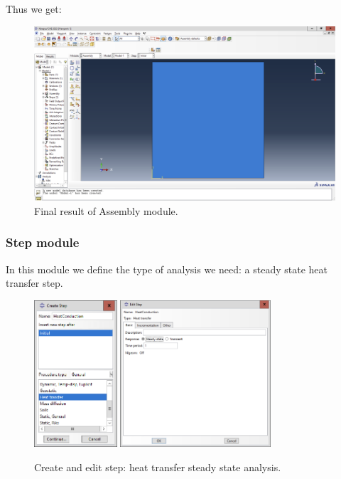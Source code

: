 Thus we get:
\begin{figure}[H]
    \centering
    \includegraphics[width=1\textwidth]{Images/ab2/ab7.png}
    \caption{Final result of Assembly module.}
    \label{fig:ab7}
\end{figure}

\subsubsection{Step module}

In this module we define the type of analysis we need: a steady state heat transfer step.
\begin{figure}[H]
    \centering
    \includegraphics[width=0.275\textwidth]{Images/ab2/ab8.png} \qquad
    \includegraphics[width=0.5\textwidth]{Images/ab2/ab9.png}
    \caption{Create and edit step: heat transfer steady state analysis.}
    \label{fig:ab89}
\end{figure}

